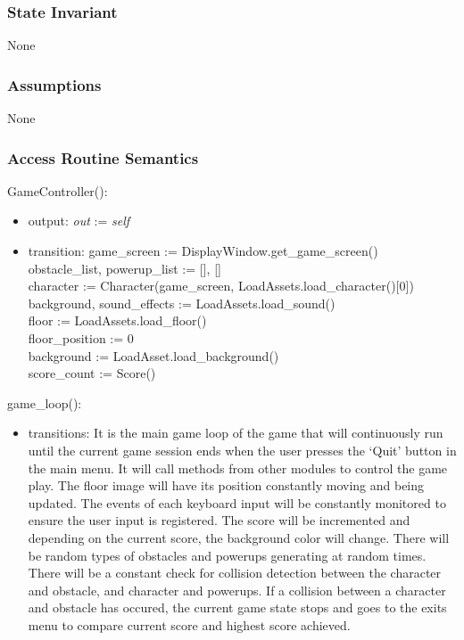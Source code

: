\documentclass[12pt]{article}
\begin{document}
\subsubsection* {State Invariant}

None

\subsubsection* {Assumptions}

None

\subsubsection* {Access Routine Semantics}

GameController():
\begin{itemize}
    \item output: \textit{out} := \textit{self}
    \item transition: game\_screen := DisplayWindow.get\_game\_screen()\\
    obstacle\_list, powerup\_list := [], []\\
    character := Character(game\_screen, LoadAssets.load\_character()[0])\\
    background, sound\_effects := LoadAssets.load\_sound()\\
    floor := LoadAssets.load\_floor()\\
    floor\_position := 0\\
    background := LoadAsset.load\_background()\\
    score\_count := Score()
\end{itemize}

\noindent game\_loop():
\begin{itemize}
    \item transitions: It is the main game loop of the game that will continuously run until the current game session ends when the user presses the `Quit' button in the main menu. It will call methods from other modules to control the game play. The floor image will have its position constantly moving and being updated. The events of each keyboard input will be constantly monitored to ensure the user input is registered. The score will be incremented and depending on the current score, the background color will change. There will be random types of obstacles  and powerups generating at random times. There will be a constant check for collision detection between the character and obstacle, and character and powerups. If a collision between a character and obstacle has occured, the current game state stops and goes to the exits menu to compare current score and highest score achieved. 
\end{itemize}
\end{document}
